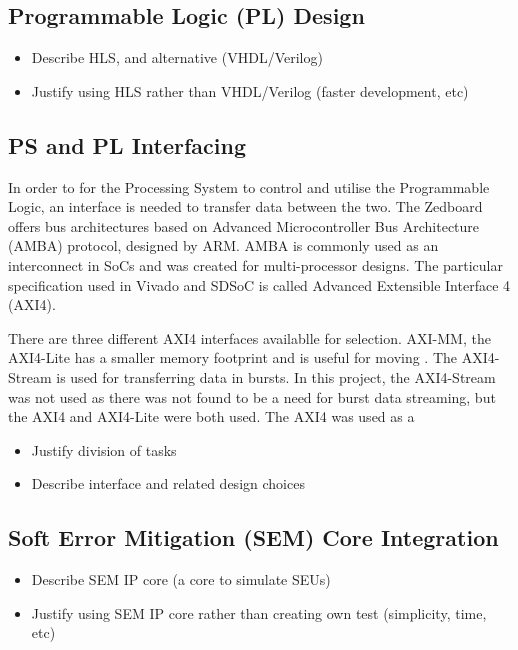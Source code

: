 \documentclass[12pt]{article}
\begin{document}
\subsection{Programmable Logic (PL) Design}
\label{sec:Design-PL}


\begin{itemize}
\item Describe HLS, and alternative (VHDL/Verilog)
\item Justify using HLS rather than VHDL/Verilog (faster development, etc)
\end{itemize}

\subsection{PS and PL Interfacing}
\label{sec:Design-PSnPL}

In order to for the Processing System to control and utilise the Programmable Logic, an interface is needed to transfer data between the two. The Zedboard offers bus architectures based on Advanced Microcontroller Bus Architecture (AMBA) protocol, designed by ARM. AMBA is commonly used as an interconnect in SoCs and was created for multi-processor designs. The particular specification used in Vivado and SDSoC is called Advanced Extensible Interface 4 (AXI4). 

There are three different AXI4 interfaces availablle for selection. AXI-MM, the AXI4-Lite has a smaller memory footprint and is useful for moving .
The AXI4-Stream is used for transferring data in bursts. In this project, the AXI4-Stream was not used as there was not found to be a need for burst data streaming, but the AXI4 and AXI4-Lite were both used. The AXI4 was used as a 

\begin{itemize}
\item Justify division of tasks
\item Describe interface and related design choices
\end{itemize}

\subsection{Soft Error Mitigation (SEM) Core Integration}
\label{sec:Design-SEM}

\begin{itemize}
\item Describe SEM IP core (a core to simulate SEUs)
\item Justify using SEM IP core rather than creating own test (simplicity, time, etc)
\end{itemize}
\end{document}
